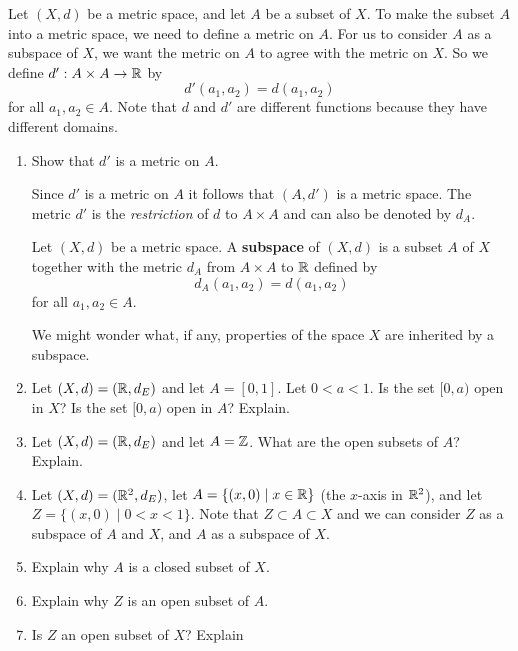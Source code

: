 \begin{pa}  Let $(X,d)$ be a metric space, and let $A$ be a subset of $X$. To make the subset $A$ into a metric space, we need to define a metric on $A$. For us to consider $A$ as a subspace of $X$, we want the metric on $A$ to agree with the metric on $X$. So we define $d' : A \times A \to \mathbb{R}$ by 
\[d'(a_1,a_2) = d(a_1,a_2)\]
for all $a_1, a_2 \in A$. 
Note that $d$ and $d'$ are different functions because they have different domains. 
\begin{enumerate}
\item Show that $d'$ is a metric on $A$.

\vspace{0.25in}

Since $d'$ is a metric on $A$ it follows that $(A,d')$ is a metric space. The metric $d'$ is the \emph{restriction} of $d$ to $A \times A$ and can also be denoted by $d_A$. 

\begin{definition} Let $(X,d)$ be a metric space. A \textbf{subspace} of $(X,d)$ is a subset $A$ of $X$ together with the metric $d_A$ from $A \times A$ to $\mathbb{R}$ defined by 
\[d_A(a_1,a_2) = d(a_1,a_2)\]
for all $a_1,a_2 \in A$.  
\end{definition}

We might wonder what, if any, properties of the space $X$ are inherited by a subspace.

\vspace{0.25in}

\item Let $(X,d) = (\mathbb{R},d_E)$ and let $A = [0,1]$. Let $0 < a < 1$. Is the set $[0,a)$ open in $X$? Is the set $[0,a)$ open in $A$? Explain.

\item Let $(X,d) = (\mathbb{R},d_E)$ and let $A = \mathbb{Z}$. What are the open subsets of $A$? Explain. 

\item  Let $(X,d) = (\mathbb{R}^2,d_E)$, let $A = \{(x,0) \mid x \in \mathbb{R}\}$ (the $x$-axis in $\mathbb{R}^2$), and let $Z = \{(x,0) \mid 0 < x < 1\}$. Note that $Z \subset A \subset X$ and we can consider $Z$ as a subspace of $A$ and $X$, and $A$ as a subspace of $X$. 
		\ba
		\item Explain why $A$ is a closed subset of $X$.
	
		\item Explain why $Z$ is an open subset of $A$.

		\item Is $Z$ an open subset of $X$? Explain

		\ea
	
	\end{enumerate}
	
\end{pa}


